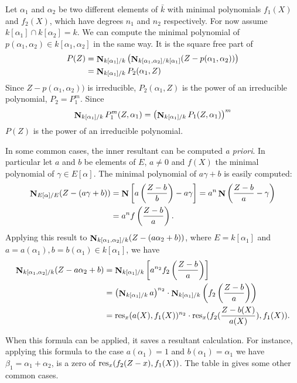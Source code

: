 Let $\alpha_1$ and $\alpha_2$ be two different elements of $\bar{k}$ with
minimal polynomials $f_1(X)$ and $f_2(X)$, which have degrees $n_1$ and
$n_2$ respectively.  For now assume $k[\alpha_1]\cap
k[\alpha_2] = k$.  We can compute the minimal polynomial of
$p(\alpha_1,\alpha_2) \in k[\alpha_1, \alpha_2]$ in the same way.  It
is the square free part of 
\[
\begin{aligned}
P(Z) & =
\mathop{\mathbf{N}}\nolimits_{k[\alpha_1]/k}\left(\mathop{\mathbf{N}}\nolimits_{k[\alpha_1,\alpha_2]/k[\alpha_1]}(Z-p(\alpha_1,\alpha_2))\right)\\ 
  & = \mathop{\mathbf{N}}\nolimits_{k[\alpha_1]/k} P_2(\alpha_1, Z)
\end{aligned}
\]
Since $Z - p(\alpha_1, \alpha_2))$ is irreducible, $P_2(\alpha_1, Z)$
is the power of an irreducible polynomial, $P_2 = P_1^m$.  Since
\[
\mathop{\mathbf{N}}\nolimits_{k[\alpha_1]/k} P_1^{m}(Z, \alpha_1) = 
\left(\mathop{\mathbf{N}}\nolimits_{k[\alpha_1]/k} P_1(Z, \alpha_1) \right)^{m}
\]
$P(Z)$ is the power of an irreducible polynomial.

In some common cases, the inner resultant can be computed {\em a
priori\/}.  In particular let $a$ and $b$ be elements of $E$, $a \not=
0$ and $f(X)$ the minimal polynomial of $\gamma \in E[\alpha]$.  The
minimal polynomial of $a\gamma + b$ is easily computed:
\[
\begin{aligned}
\mathop{\mathbf{N}}\nolimits_{E[\alpha]/E} (Z - (a\gamma +b)) 
  & = \mathop{\mathbf{N}}\nolimits \left[ a \left(\frac{Z-b}{b}\right)- a \gamma\right]
    = a^n \mathop{\mathbf{N}}\nolimits \left(\frac{Z- b}{a} - \gamma\right) \\
  & = a^n f\left(\frac{Z-b}{a}\right).
\end{aligned}
\]
Applying this result to $\mathop{\mathbf{N}}\nolimits_{k[\alpha_1,\alpha_2]/k} (Z - (a
\alpha_2+b))$, where $E = k[\alpha_1]$ and $a = a(\alpha_1), b =
b(\alpha_1)  \in k[\alpha_1]$, we have
\[
\begin{aligned}
\mathop{\mathbf{N}}\nolimits_{k[\alpha_1,\alpha_2]/k}(Z - a\alpha_2+b)
  & = \mathop{\mathbf{N}}\nolimits_{k[\alpha_1]/k}\left[ a^{n_2}
                f_2\left(\frac{Z-b}{a}\right)\right]\\ 
  & = \left( \mathop{\mathbf{N}}\nolimits_{k[\alpha_1]/k} a\right)^{n_2} \cdot
           \mathop{\mathbf{N}}\nolimits_{k[\alpha_1]/k}\left(f_2\left(\frac{Z-b}{a}\right)\right) \\
  & = \mathop{\rm res}\nolimits_x(a(X), f_1(X))^{n_2} \cdot
                \mathop{\rm res}\nolimits_x(f_2(\frac{Z-b(X)}{a(X)}),f_1(X)). 
\end{aligned}
\]

When this formula can be applied, it saves a resultant calculation.  For
instance, applying this formula to the case $a(\alpha_1) = 1$ and
$b(\alpha_1) = \alpha_1$ we have $\beta_1 = \alpha_1 + \alpha_2$, is a zero
of $\mathop{\rm res}\nolimits_x(f_2(Z - x), f_1(X))$.  The table in
 gives some other common cases.

